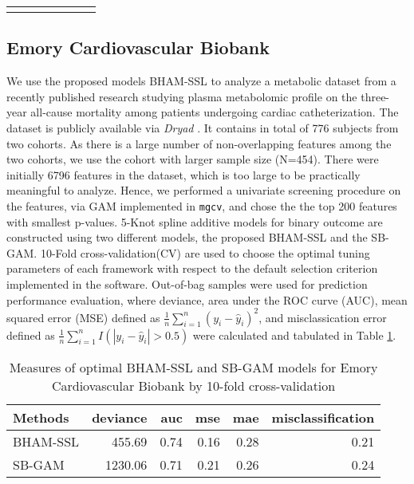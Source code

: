 \documentclass[AMA,STIX1COL,]{WileyNJD-v2}
\begin{document}
\begin{longtable}[c]{|p{0.75in}|p{0.75in}|p{0.75in}|p{0.75in}|p{0.75in}|p{0.75in}|p{0.75in}}
\noalign{\global\setlength{\arrayrulewidth}{2pt}}\arrayrulecolor[HTML]{666666}\cline{1-7}



\end{longtable}

\hypertarget{emory-cardiovascular-biobank}{%
\subsection{Emory Cardiovascular
Biobank}\label{emory-cardiovascular-biobank}}

We use the proposed models BHAM-SSL to analyze a metabolic dataset from
a recently published research \citep{Mehta2020} studying plasma
metabolomic profile on the three-year all-cause mortality among patients
undergoing cardiac catheterization. The dataset is publicly available
via \textit{Dryad} \citep{Mehta2020_data}. It contains in total of 776
subjects from two cohorts. As there is a large number of non-overlapping
features among the two cohorts, we use the cohort with larger sample
size (N=454). There were initially 6796 features in the dataset, which
is too large to be practically meaningful to analyze. Hence, we
performed a univariate screening procedure on the features, via GAM
implemented in \texttt{mgcv}, and chose the the top 200 features with
smallest p-values. 5-Knot spline additive models for binary outcome are
constructed using two different models, the proposed BHAM-SSL and the
SB-GAM. 10-Fold cross-validation(CV) are used to choose the optimal
tuning parameters of each framework with respect to the default
selection criterion implemented in the software. Out-of-bag samples were
used for prediction performance evaluation, where deviance, area under
the ROC curve (AUC), mean squared error (MSE) defined as
\(\frac{1}{n}\sum\limits^{n}_{i=1}(y_i - \hat y_i)^2\), and
misclassication error defined as
\(\frac{1}{n}\sum\limits^{n}_{i=1}I(|y_i - \hat y_i|>0.5)\) were
calculated and tabulated in Table \ref{tab:ECB_res}.

\begin{table}[ht]
\centering
\begin{tabular}{lrrrrr}
  \hline
Methods & deviance & auc & mse & mae & misclassification \\ 
  \hline
BHAM-SSL & 455.69 & 0.74 & 0.16 & 0.28 & 0.21 \\ 
  SB-GAM & 1230.06 & 0.71 & 0.21 & 0.26 & 0.24 \\ 
   \hline
\end{tabular}
\caption{Measures of optimal BHAM-SSL and SB-GAM models for Emory Cardiovascular Biobank by 10-fold cross-validation} 
\label{tab:ECB_res}
\end{table}
\end{document}
